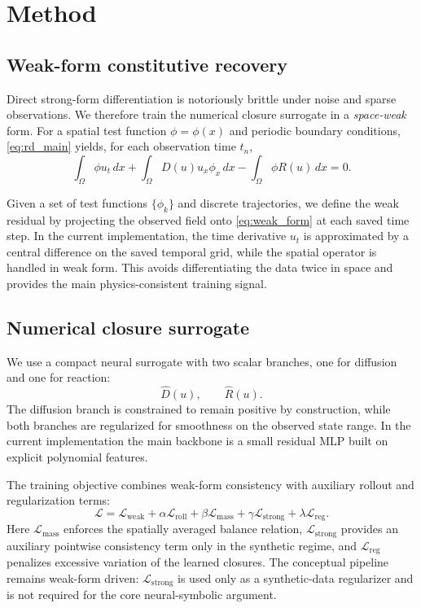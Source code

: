 \section{Method}

\subsection{Weak-form constitutive recovery}

Direct strong-form differentiation is notoriously brittle under noise and sparse observations. We therefore train the numerical closure surrogate in a \emph{space-weak} form. For a spatial test function $\phi=\phi(x)$ and periodic boundary conditions, \eqref{eq:rd_main} yields, for each observation time $t_n$,
\begin{equation}
\int_\Omega \phi u_t \, dx
+ \int_\Omega D(u) u_x \phi_x \, dx
- \int_\Omega \phi R(u) \, dx
= 0.
\label{eq:weak_form}
\end{equation}

Given a set of test functions $\{ \phi_k \}$ and discrete trajectories, we define the weak residual by projecting the observed field onto \eqref{eq:weak_form} at each saved time step. In the current implementation, the time derivative $u_t$ is approximated by a central difference on the saved temporal grid, while the spatial operator is handled in weak form. This avoids differentiating the data twice in space and provides the main physics-consistent training signal.

\subsection{Numerical closure surrogate}

We use a compact neural surrogate with two scalar branches, one for diffusion and one for reaction:
\begin{equation}
\widehat{D}(u), \qquad \widehat{R}(u).
\end{equation}
The diffusion branch is constrained to remain positive by construction, while both branches are regularized for smoothness on the observed state range. In the current implementation the main backbone is a small residual MLP built on explicit polynomial features.

The training objective combines weak-form consistency with auxiliary rollout and regularization terms:
\begin{equation}
\mathcal{L}
= \mathcal{L}_{\text{weak}}
+ \alpha \mathcal{L}_{\text{roll}}
+ \beta \mathcal{L}_{\text{mass}}
+ \gamma \mathcal{L}_{\text{strong}}
+ \lambda \mathcal{L}_{\text{reg}}.
\end{equation}
Here $\mathcal{L}_{\text{mass}}$ enforces the spatially averaged balance relation, $\mathcal{L}_{\text{strong}}$ provides an auxiliary pointwise consistency term only in the synthetic regime, and $\mathcal{L}_{\text{reg}}$ penalizes excessive variation of the learned closures. The conceptual pipeline remains weak-form driven: $\mathcal{L}_{\text{strong}}$ is used only as a synthetic-data regularizer and is not required for the core neural-symbolic argument.


